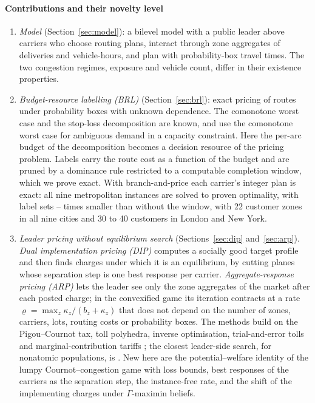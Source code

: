 \documentclass[preprint,11pt]{elsarticle}
\theoremstyle{definition}
\theoremstyle{remark}
\begin{document}
\paragraph{Contributions and their novelty level}
\begin{enumerate}[label=(\roman*),leftmargin=*,itemsep=0pt]
\item \emph{Model} (Section~\ref{sec:model}): a bilevel model with a public leader above carriers who choose routing plans, interact through zone aggregates of deliveries and vehicle-hours, and plan with probability-box travel times. The two congestion regimes, exposure and vehicle count, differ in their existence properties.
\item \emph{Budget-resource labelling (BRL)} (Section~\ref{sec:brl}): exact pricing of routes under probability boxes with unknown dependence. The comonotone worst case and the stop-loss decomposition \citep{Meilijson1979,Tchen1980} are known, and \citet{GhosalHoWiesemann2024} use the comonotone worst case for ambiguous demand in a capacity constraint. Here the per-arc budget of the decomposition becomes a decision resource of the pricing problem. Labels carry the route cost as a function of the budget and are pruned by a dominance rule restricted to a computable completion window, which we prove exact. With branch-and-price each carrier's integer plan is exact: all nine metropolitan instances are solved to proven optimality, with label sets \BrlLabNowinMetroMin--\BrlLabNowinMetroMax{} times smaller than without the window, with 22 customer zones in all nine cities and 30 to 40 customers in London and New York.
\item \emph{Leader pricing without equilibrium search} (Sections~\ref{sec:dip} and~\ref{sec:arp}). \emph{Dual implementation pricing (DIP)} computes a socially good target profile and then finds charges under which it is an equilibrium, by cutting planes whose separation step is one best response per carrier. \emph{Aggregate-response pricing (ARP)} lets the leader see only the zone aggregates of the market after each posted charge; in the convexified game its iteration contracts at a rate $\varrho=\max_z\kappa_z/(b_z+\kappa_z)$ that does not depend on the number of zones, carriers, lots, routing costs or probability boxes. The methods build on the Pigou--Cournot tax, toll polyhedra, inverse optimisation, trial-and-error tolls and marginal-contribution tariffs \citep{Buchanan1969,Bergendorff1997,Ahuja2001,Yang2004,Wolpert2001,Sandholm2002,Maheshwari2022}; the closest leader-side search, for nonatomic populations, is \citet{Masiha2026}. New here are the potential--welfare identity of the lumpy Cournot--congestion game with loss bounds, best responses of the carriers as the separation step, the instance-free rate, and the shift of the implementing charges under $\Gamma$-maximin beliefs.

\end{enumerate}
\end{document}
